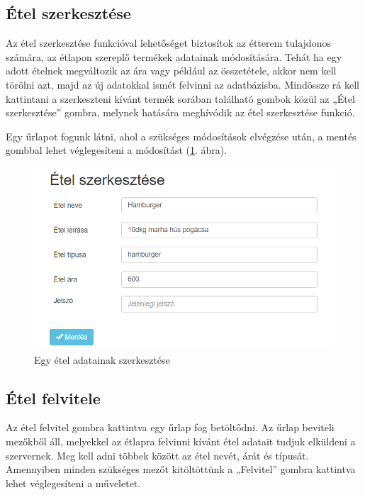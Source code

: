 \subsection{Étel szerkesztése}

Az étel szerkesztése funkcióval lehetőséget biztosítok az étterem tulajdonos számára, az étlapon szereplő termékek adatainak módosítására. Tehát ha egy adott ételnek megváltozik az ára vagy például az összetétele, akkor nem kell törölni azt, majd az új adatokkal ismét felvinni az adatbázisba. Mindössze rá kell kattintani a szerkeszteni kívánt termék sorában található gombok közül az „Étel szerkesztése” gombra, melynek hatására meghívódik az étel szerkesztése funkció.

Egy űrlapot fogunk látni, ahol a szükséges módosítások elvégzése után, a mentés gombbal lehet véglegesíteni a módosítást (\ref{fig:edit_meal}. ábra).

\begin{figure}
\centering
\includegraphics[scale=0.8]{kepek/edit_meal.png}
\caption{Egy étel adatainak szerkesztése}
\label{fig:edit_meal}
\end{figure}

\subsection{Étel felvitele}

Az étel felvitel gombra kattintva egy űrlap fog betöltődni. Az űrlap beviteli mezőkből áll, melyekkel az étlapra felvinni kívánt étel adatait tudjuk elküldeni a szervernek. Meg kell adni többek között az étel nevét, árát és típusát. Amennyiben minden szükséges mezőt kitöltöttünk a „Felvitel” gombra kattintva lehet véglegesíteni a műveletet.


